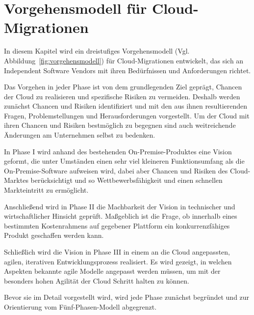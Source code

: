 \section{Vorgehensmodell für Cloud-Migrationen}
\label{cha:entwickelung_vorgehensmodell}
In diesem Kapitel wird ein dreistufiges Vorgehensmodell (Vgl. 
Abbildung~\ref{fig:vorgehensmodell}) für Cloud-Migrationen entwickelt, das sich 
an Independent Software Vendors mit ihren Bedürfnissen und Anforderungen 
richtet.

Das Vorgehen in jeder Phase ist von dem grundlegenden Ziel geprägt, Chancen der 
Cloud zu realisieren und spezifische Risiken zu vermeiden. Deshalb werden 
zunächst Chancen und Risiken identifiziert und mit den aus ihnen resultierenden 
Fragen, Problemstellungen und Herausforderungen vorgestellt. Um der 
Cloud mit ihren Chancen und Risiken bestmöglich zu begegnen sind auch 
weitreichende Änderungen am Unternehmen selbst zu bedenken.

In Phase I wird anhand des bestehenden On-Premise-Produktes eine Vision 
geformt, die unter Umständen einen sehr viel kleineren Funktionsumfang als die 
On-Premise-Software aufweisen wird, dabei aber Chancen und Risiken des 
Cloud-Marktes berücksichtigt und so Wettbewerbsfähigkeit und einen schnellen 
Markteintritt zu ermöglicht. 

Anschließend wird in Phase II die Machbarkeit der Vision in technischer und 
wirtschaftlicher Hinsicht geprüft. Maßgeblich ist die Frage, ob innerhalb 
eines bestimmten Kostenrahmens auf gegebener
Plattform ein konkurrenzfähiges Produkt geschaffen werden kann.

Schließlich wird die Vision in Phase III in einem an die Cloud 
angepassten, agilen, iterativen Entwicklungsprozess realisiert. Es wird 
gezeigt, in welchen Aspekten bekannte agile Modelle angepasst werden müssen, um 
mit der besonders hohen Agilität der Cloud Schritt halten zu können. 

Bevor sie im Detail vorgestellt wird, wird jede Phase zunächst begründet 
und zur Orientierung vom Fünf-Phasen-Modell abgegrenzt. 


\begin{comment}
Das Fünf-Phasen-Modell beginnt mit einer technischen und 
wirtschaftlichen Machbarkeitsstudie. Die Migration einer On-Premise-Software in 
die Cloud bedeutet für das migrierende Unternehmen die Erschließung eines ganz 
neuen Marktes, der sich grundlegend vom bekannten Markt unterscheidet. Aus 
diesem Grund kann das Cloud-Produkt sich grundlegend vom bisherigen 
On-Premise-Produkt unterscheiden. Deshalb wird 
\citeflow{how_saas_changes_an_isvs_business} und 
\citeflow{towards_modelling_a_cloud_applications_life_cycle} eine zusätzliche 
Phase vorgeschlagen, in der eine Vision der künftigen Cloud-Lösung entworfen 
wird. Mit dieser Vision kann der Leistungsumfang abgeschätzt werden und auch, 
wie sich das Unternehmen verändern muss, um dieser Vision zu entsprechen. 
(Kapitel~\ref{cha:phaseI})\\
\end{comment}

